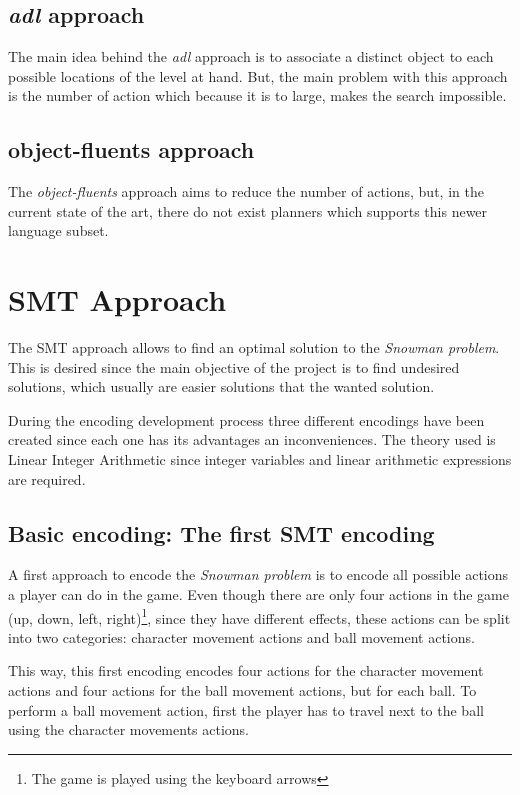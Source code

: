 \documentclass{report}
\theoremstyle{plain}
\begin{document}
\subsection{\emph{adl} approach}
The main idea behind the \emph{adl} approach is to associate a distinct object to each possible locations of the level at hand. But, the main problem with this approach is the number of action which because it is to large, makes the search impossible.

\subsection{object-fluents approach}
The \emph{object-fluents} approach aims to reduce the number of actions, but, in the current state of the art, there do not exist planners which supports this newer language subset.

\section{SMT Approach}
The SMT approach allows to find an optimal solution to the \emph{Snowman problem}. This is desired since the main objective of the project is to find undesired solutions, which usually are easier solutions that the wanted solution.

During the encoding development process three different encodings have been created since each one has its advantages an inconveniences. The theory used is Linear Integer Arithmetic since integer variables and linear arithmetic expressions are required.

\subsection{Basic encoding: The first SMT encoding}
A first approach to encode the \emph{Snowman problem} is to encode all possible actions a player can do in the game. Even though there are only four actions in the game (up, down, left, right)\footnote{The game is played using the keyboard arrows}, since they have different effects, these actions can be split into two categories: character movement actions and ball movement actions.

This way, this first encoding encodes four actions for the character movement actions and four actions for the ball movement actions, but for each ball. To perform a ball movement action, first the player has to travel next to the ball using the character movements actions.
\end{document}
